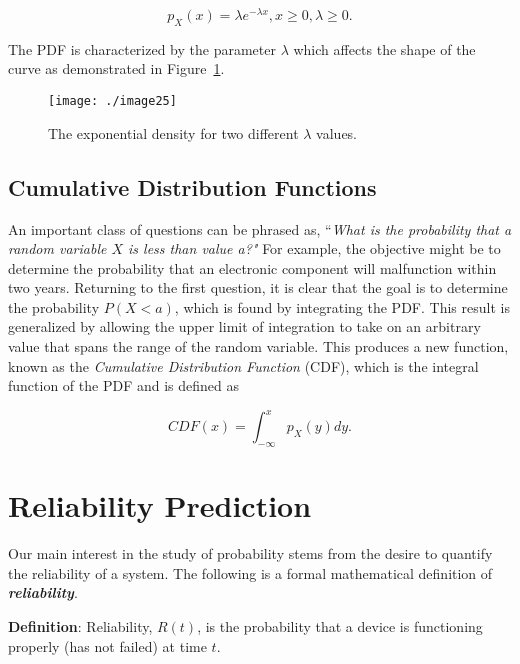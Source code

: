 \begin{equation}
\label{equ:exponentialDensity}
p_X(x) = \lambda e^{-\lambda x} , x \geq 0, \lambda \geq 0.
\end{equation}

The PDF is characterized by the parameter $\lambda$ which affects the
shape of the curve as demonstrated in 
Figure~\ref{figure:exponentialDensityFunction}.


\begin{figure}
\texttt{[image: ./image25]}
\caption{The exponential density for two different $\lambda$ values.}
\label{figure:exponentialDensityFunction}
\end{figure}


\subsection{Cumulative Distribution Functions}
\label{cumulative-distribution-functions}

An important class of questions can be phrased as, ``\emph{What is the
probability that a random variable $X$ is less than value a?"} For
example, the objective might be to determine the probability that an
electronic component will malfunction within two years. Returning to the
first question, it is clear that the goal is to determine the
probability $P(X<a)$, which is found by
integrating the PDF. This result is generalized by allowing the upper
limit of integration to take on an arbitrary value that spans the range
of the random variable. This produces a new function, known as the
\emph{Cumulative Distribution Function} (CDF), which is the integral
function of the PDF and is defined as

\begin{equation}
\label{equ:exponentialDensity}
CDF(x) = \int^x_{-\infty} p_X(y)dy.
\end{equation}

\section{Reliability Prediction}
\label{section:reliability-prediction}

Our main interest in the study of probability stems from the desire to
quantify the reliability of a system. The following is a formal
mathematical definition of \emph{\textbf{reliability}}.

\begin{itquote}
\textbf{Definition}: Reliability, $R(t)$, is the probability that a
device is functioning properly (has not failed) at time $t$.
\end{itquote}

